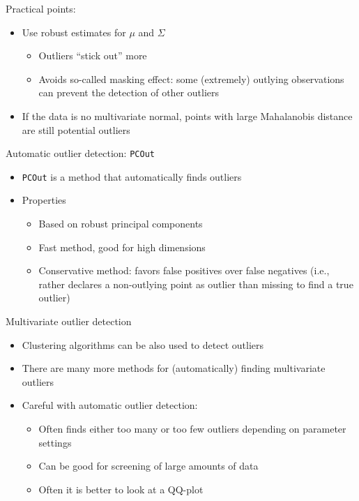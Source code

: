 \documentclass[a4paper]{article}
\begin{document}
Practical points:
\begin{itemize}
    \item Use robust estimates for $\mu$ and $\Sigma$
    \begin{itemize}
        \item Outliers ``stick out'' more
        \item Avoids so-called masking effect: some (extremely) outlying observations can prevent the detection of other outliers
    \end{itemize}
    \item If the data is no multivariate normal, points with large Mahalanobis distance are still potential outliers
\end{itemize}

Automatic outlier detection: \texttt{PCOut}
\begin{itemize}
    \item \texttt{PCOut} is a method that automatically finds outliers
    \item Properties
    \begin{itemize}
        \item Based on robust principal components
        \item Fast method, good for high dimensions
        \item Conservative method: favors false positives over false negatives (i.e., rather declares a non-outlying point as outlier than missing to find a true outlier)
    \end{itemize}
\end{itemize}

Multivariate outlier detection
\begin{itemize}
    \item Clustering algorithms can be also used to detect outliers
    \item There are many more methods for (automatically) finding multivariate outliers
    \item Careful with automatic outlier detection:
    \begin{itemize}
        \item Often finds either too many or too few outliers depending on parameter settings
        \item Can be good for screening of large amounts of data
        \item Often it is better to look at a QQ-plot
    \end{itemize}
\end{itemize}
\end{document}
